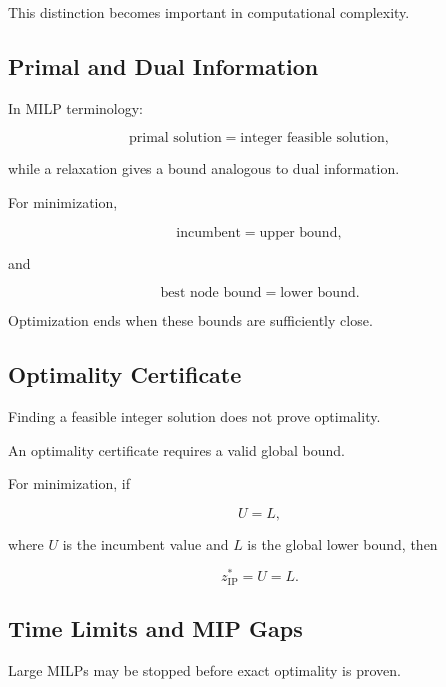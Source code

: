 This distinction becomes important in computational complexity.

\subsection{Primal and Dual Information}
\label{subsec:mip-primal-dual-information}

In MILP terminology:

\[
\boxed{
\text{primal solution}
=
\text{integer feasible solution},
}
\]

while a relaxation gives a bound analogous to dual information.

For minimization,

\[
\boxed{
\text{incumbent}
=
\text{upper bound},
}
\]

and

\[
\boxed{
\text{best node bound}
=
\text{lower bound}.
}
\]

Optimization ends when these bounds are sufficiently close.

\subsection{Optimality Certificate}
\label{subsec:mip-optimality-certificate}

Finding a feasible integer solution does not prove optimality.

An optimality certificate requires a valid global bound.

For minimization, if

\[
\boxed{
U=L,
}
\]

where \(U\) is the incumbent value and \(L\) is the global lower bound,
then

\[
\boxed{
z_{\mathrm{IP}}^*=U=L.
}
\]

\subsection{Time Limits and MIP Gaps}
\label{subsec:mip-time-limit-gap}

Large MILPs may be stopped before exact optimality is proven.

